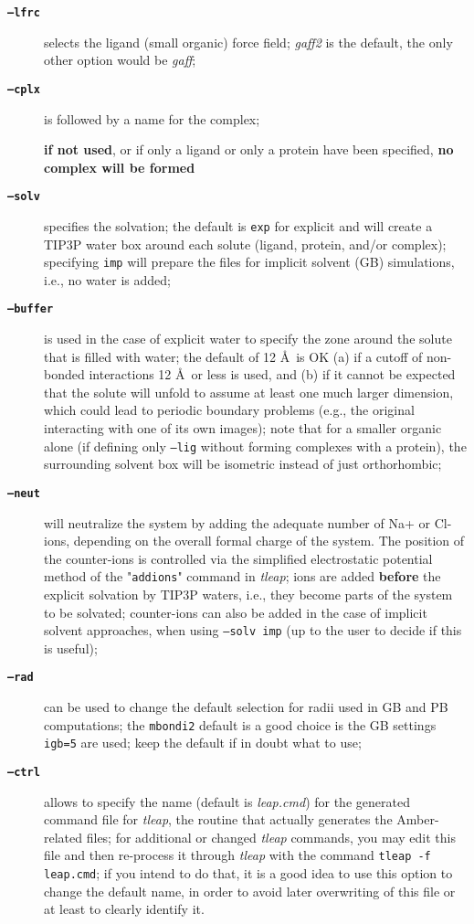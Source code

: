 \documentclass[10pt,landscape,twocolumn]{article}
\begin{document}
\begin{description}
\item[\textbf{\texttt{--lfrc}}] selects the ligand (small organic) force field; \textsl{gaff2} is the default, the only other option would be \textsl{gaff};  

\item[\textbf{\texttt{--cplx}}] is followed by a name for the complex; \begin{mdframed}\textbf{if not used}, or if only a ligand or only a protein have been specified, \textbf{no complex will be formed}\end{mdframed} 

\item[\textbf{\texttt{--solv}}] specifies the solvation; the default is \texttt{exp} for explicit and will create a TIP3P water box around each solute (ligand, protein, and/or complex); specifying \texttt{imp} will prepare the files for implicit solvent (GB) simulations, i.e., no water is added;

\item[\textbf{\texttt{--buffer}}] is used in the case of explicit water to specify the zone around the solute that is filled with water; the default of 12 \AA \ is OK (a) if a cutoff of non-bonded interactions 12 \AA \ or less is used, and (b) if it cannot be expected that the solute will unfold to assume at least one much larger dimension, which could lead to periodic boundary problems (e.g., the original interacting with one of its own images); note that for a smaller organic alone (if defining only \texttt{--lig} without forming complexes with a protein), the surrounding solvent box will be isometric instead of just orthorhombic;

\item[\textbf{\texttt{--neut}}] will neutralize the system by adding the adequate number of Na+ or Cl- ions, depending on the overall formal charge of the system. The position of the counter-ions is controlled via the simplified electrostatic potential method of the "\texttt{addions}" command in \textsl{tleap}; ions are added \textbf{before} the explicit solvation by TIP3P waters, i.e., they become parts of the system to be solvated; counter-ions can also be added in the case of implicit solvent approaches, when using \texttt{--solv imp} (up to the user to decide if this is useful);

\item[\textbf{\texttt{--rad}}] can be used to change the default selection for radii used in GB and PB computations; the \texttt{mbondi2} default is a good choice is the GB settings \texttt{igb=5} are used; keep the default if in doubt what to use;
\newpage
\item[\textbf{\texttt{--ctrl}}] allows to specify the name (default is \textsl{leap.cmd}) for the generated command file for \textsl{tleap}, the routine that actually generates the Amber-related files; for additional or changed \textsl{tleap} commands, you may edit this file and then re-process it through \textsl{tleap} with the command \texttt{tleap -f leap.cmd}; if you intend to do that, it is a good idea to use this option to change the default name, in order to avoid later overwriting of this file or at least to clearly identify it.
\end{description}
\end{document}
